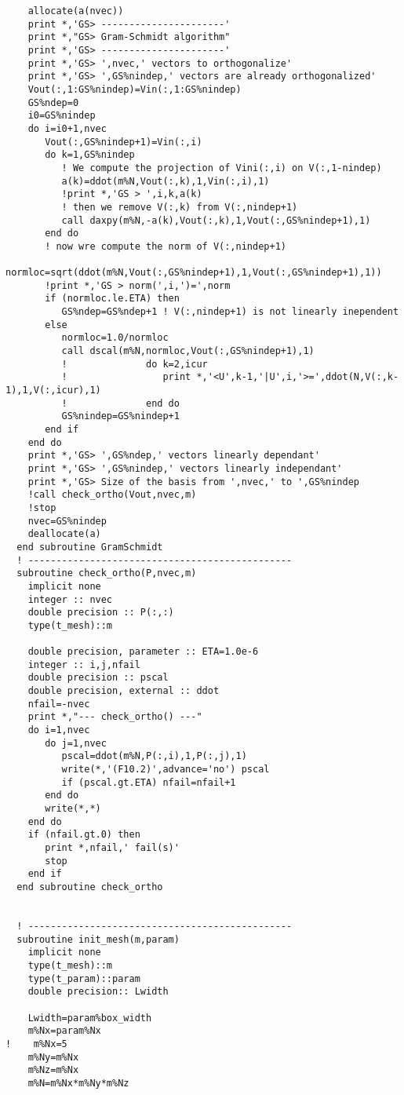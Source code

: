 \documentclass[11pt,a4paper]{article}
\begin{document}
\begin{verbatim}
    allocate(a(nvec))
    print *,'GS> ----------------------'
    print *,"GS> Gram-Schmidt algorithm"
    print *,'GS> ----------------------'
    print *,'GS> ',nvec,' vectors to orthogonalize'
    print *,'GS> ',GS%nindep,' vectors are already orthogonalized'
    Vout(:,1:GS%nindep)=Vin(:,1:GS%nindep)
    GS%ndep=0 
    i0=GS%nindep
    do i=i0+1,nvec
       Vout(:,GS%nindep+1)=Vin(:,i)
       do k=1,GS%nindep
          ! We compute the projection of Vini(:,i) on V(:,1-nindep)
          a(k)=ddot(m%N,Vout(:,k),1,Vin(:,i),1)
          !print *,'GS > ',i,k,a(k)
          ! then we remove V(:,k) from V(:,nindep+1)
          call daxpy(m%N,-a(k),Vout(:,k),1,Vout(:,GS%nindep+1),1)
       end do
       ! now wre compute the norm of V(:,nindep+1)
       normloc=sqrt(ddot(m%N,Vout(:,GS%nindep+1),1,Vout(:,GS%nindep+1),1))
       !print *,'GS > norm(',i,')=',norm
       if (normloc.le.ETA) then
          GS%ndep=GS%ndep+1 ! V(:,nindep+1) is not linearly inependent
       else
          normloc=1.0/normloc
          call dscal(m%N,normloc,Vout(:,GS%nindep+1),1)
          !              do k=2,icur
          !                 print *,'<U',k-1,'|U',i,'>=',ddot(N,V(:,k-1),1,V(:,icur),1)
          !              end do
          GS%nindep=GS%nindep+1
       end if
    end do
    print *,'GS> ',GS%ndep,' vectors linearly dependant'
    print *,'GS> ',GS%nindep,' vectors linearly independant'
    print *,'GS> Size of the basis from ',nvec,' to ',GS%nindep
    !call check_ortho(Vout,nvec,m)
    !stop
    nvec=GS%nindep
    deallocate(a)
  end subroutine GramSchmidt
  ! -----------------------------------------------
  subroutine check_ortho(P,nvec,m)
    implicit none
    integer :: nvec
    double precision :: P(:,:)
    type(t_mesh)::m

    double precision, parameter :: ETA=1.0e-6
    integer :: i,j,nfail
    double precision :: pscal
    double precision, external :: ddot
    nfail=-nvec
    print *,"--- check_ortho() ---"      
    do i=1,nvec
       do j=1,nvec
          pscal=ddot(m%N,P(:,i),1,P(:,j),1)
          write(*,'(F10.2)',advance='no') pscal
          if (pscal.gt.ETA) nfail=nfail+1
       end do
       write(*,*)
    end do
    if (nfail.gt.0) then
       print *,nfail,' fail(s)'
       stop
    end if
  end subroutine check_ortho
  

  ! -----------------------------------------------
  subroutine init_mesh(m,param)
    implicit none
    type(t_mesh)::m
    type(t_param)::param
    double precision:: Lwidth 

    Lwidth=param%box_width
    m%Nx=param%Nx
!    m%Nx=5
    m%Ny=m%Nx
    m%Nz=m%Nx
    m%N=m%Nx*m%Ny*m%Nz


\end{verbatim}
\end{document}
